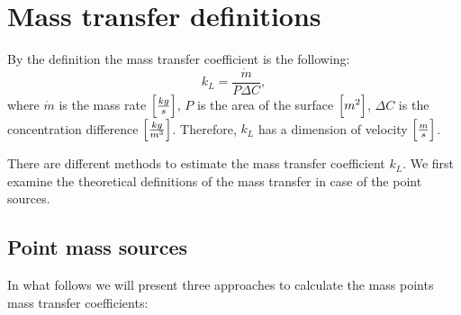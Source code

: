 \documentclass{article}
\newcommand{\beq}{\begin{equation}}
\newcommand{\feq}{\end{equation}}
\begin{document}
\section{Mass transfer definitions}
By the definition the mass transfer coefficient is the following:
\beq
k_L=\frac{\dot{m}}{P \Delta C},
\feq
where $\dot{m}$ is the mass rate $\Bigl[\frac{kg}{s}\Bigr]$, $P$ is the area of the surface
$\Bigl[m^2\Bigr]$, $\Delta C$ is the concentration difference $\Bigl[\frac{kg}{m^3}\Bigr]$.
Therefore, $k_L$ has a dimension of velocity $\Bigl[\frac{m}{s}\Bigr]$. 

There are different methods to estimate the mass transfer coefficient $k_L$. We first examine the
theoretical definitions of the mass transfer in case of the point sources.
\subsection{Point mass sources}
In what follows we will present three approaches to calculate the mass points mass transfer
coefficients:
\end{document}

